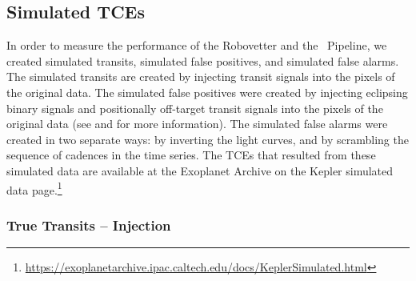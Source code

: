 \subsection{Simulated TCEs}
\label{s:simulated}
In order to measure the performance of the Robovetter and the \Kepler\ Pipeline, we created simulated transits, simulated false positives, and simulated false alarms.  The simulated transits are created by injecting transit signals into the pixels of the original data. The simulated false positives were created by injecting eclipsing binary signals and positionally off-target transit signals into the pixels of the original data (see \citealt{Coughlin2017a} and \citealt{Christiansen2017} for more information). The simulated false alarms were created in two separate ways: by inverting the light curves, and by scrambling the sequence of cadences in the time series. The TCEs that resulted from these simulated data are available at the Exoplanet Archive on the Kepler simulated data page.\footnote{\label{kepsimpagefn}\url{https://exoplanetarchive.ipac.caltech.edu/docs/KeplerSimulated.html}}


\subsubsection{True Transits -- Injection}
\label{injectsec}

